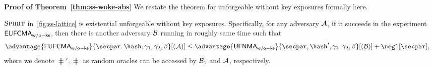 \noindent\textbf{Proof of  Theorem~\ref{thm:ss-woke-abs}}
We restate the theorem for unforgeable without key exposures formally here.
\begin{theorem}
\label{thm:eufcmawoke}
$\textsc{Spirit}$ in~\cref{fig:ss-lattice} is existential unforgeable without key exposures. Specifically, for any adversary $\mathcal{A}$, if it succeeds in the experiment $\mathsf{EUFCMA}_\mathsf{w/o-ke}$, then there is another adversary $\mathcal{B}$ running in roughly same time such that
\begin{align*}
  \advantage{\eufcmawoke}{\secpar,\hash,\gamma_1,\gamma_2,\beta}[(\Ac)]  \le \advantage{\ufnmawoke}{\secpar,\hash',\gamma_1,\gamma_2,\beta}[(\Bc)]  + \negl[\secpar],
\end{align*}
where we denote $\hash',\hash$ as random oracles can be accessed by $\mathcal{B}_1$ and $\mathcal{A}$, respectively.
\end{theorem}


